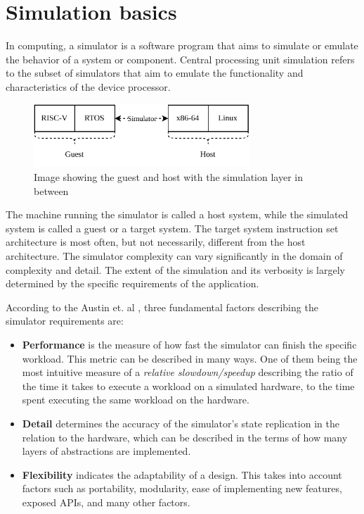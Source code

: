 
\chapter{Simulation basics}

In computing, a simulator is a software program that aims to simulate or emulate the behavior of a system or component.
Central processing unit simulation refers to the subset of simulators that aim to emulate the functionality and
characteristics of the device processor.

\begin{figure}[h]
	\centering
	\vspace{10px}
	\includegraphics[height=90px]{figures/GuestHostSimulator.pdf}
	\caption{Image showing the guest and host with the simulation layer in between}
\end{figure}


The machine running the simulator is called a host system, while the simulated system is called a guest or a target
system. The target system instruction set architecture is most often, but not necessarily, different from the host
architecture. The simulator complexity can vary significantly in the domain of complexity and detail.
The extent of the simulation and its verbosity is largely determined by the specific requirements of the application.

According to the Austin et. al \cite{Simplescalar}, three fundamental factors describing the simulator requirements are:

\begin{itemize}
	\item{\textbf{Performance} is the measure of how fast the simulator can finish the specific workload. This metric
	can be described in many ways. One of them being the most intuitive measure of a \textit{relative slowdown/speedup}
	describing the ratio of the time it takes to execute a workload on a simulated hardware, to the time spent
	executing the same workload on the hardware.}
	\item{\textbf{Detail} determines the accuracy of the simulator's state replication in the relation to the hardware,
	which can be described in the terms of how many layers of abstractions are implemented.}
	\item{\textbf{Flexibility} indicates the adaptability of a design. This takes into account factors such as
	portability, modularity, ease of implementing new features, exposed APIs, and many other factors.}
\end{itemize}

